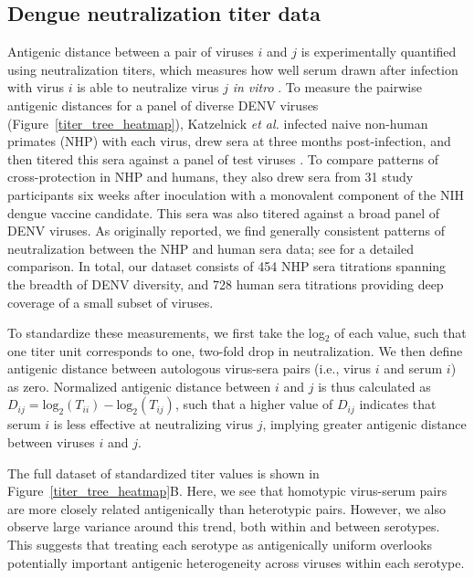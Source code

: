 \documentclass[11pt,oneside,letterpaper]{article}
\begin{document}
\subsection*{Dengue neutralization titer data}

Antigenic distance between a pair of viruses $i$ and $j$ is experimentally quantified using neutralization titers, which measures how well serum drawn after infection with virus $i$ is able to neutralize virus $j$ \textit{in vitro} \citep{russell1967dengue}.
To measure the pairwise antigenic distances for a panel of diverse DENV viruses (Figure~\ref{titer_tree_heatmap}), Katzelnick \textit{et al.} infected naive non-human primates (NHP) with each virus, drew sera at three months post-infection, and then titered this sera against a panel of test viruses \citep{katzelnick2015dengue}.
To compare patterns of cross-protection in NHP and humans, they also drew sera from 31 study participants six weeks after inoculation with a monovalent component of the NIH dengue vaccine candidate.
This sera was also titered against a broad panel of DENV viruses.
As originally reported, we find generally consistent patterns of neutralization between the NHP and human sera data; see \citep{katzelnick2015dengue} for a detailed comparison.
In total, our dataset consists of 454 NHP sera titrations spanning the breadth of DENV diversity, and 728 human sera titrations providing deep coverage of a small subset of viruses.

To standardize these measurements, we first take the log$_2$ of each value, such that one titer unit corresponds to one, two-fold drop in neutralization.
We then define antigenic distance between autologous virus-sera pairs (i.e., virus $i$ and serum $i$) as zero.
Normalized antigenic distance between $i$ and $j$ is thus calculated as $D_{ij} = \mathrm{log}_2(T_{ii}) - \mathrm{log}_2(T_{ij})$, such that a higher value of $D_{ij}$ indicates that serum $i$ is less effective at neutralizing virus $j$, implying greater antigenic distance between viruses $i$ and $j$.

The full dataset of standardized titer values is shown in Figure~\ref{titer_tree_heatmap}B.
Here, we see that homotypic virus-serum pairs are more closely related antigenically than heterotypic pairs.
However, we also observe large variance around this trend, both within and between serotypes.
This suggests that treating each serotype as antigenically uniform overlooks potentially important antigenic heterogeneity across viruses within each serotype.
\end{document}
